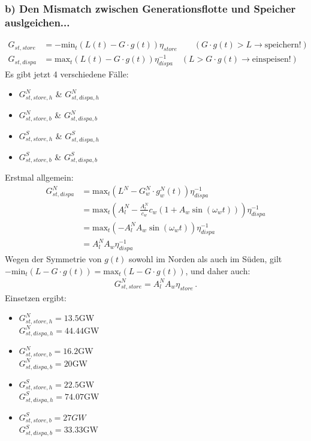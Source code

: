 \documentclass[11pt,a4paper,fleqn]{scrartcl}
\begin{document}
\begin{enumerate}[(a)]
 \subsubsection*{b) Den Mismatch zwischen Generationsflotte und Speicher auslgeichen...}
 \begin{align*}
       G_{st,store} &= - \mathrm{min}_t \left( L(t)-G\cdot g(t) \right) \eta_{store} \qquad \left(G\cdot g(t) > L \rightarrow \mathrm{speichern!}\right)\\
       G_{st,dispa} &= \mathrm{max}_t \left( L(t) - G\cdot g(t) \right) \eta_{dispa}^{-1} \quad (L > G\cdot g(t) \rightarrow \mathrm{einspeisen!})
 \end{align*}
 Es gibt jetzt 4 verschiedene Fälle:
 \begin{itemize}
       \item $G_{st,store,h}^N$ \& $G_{st,dispa,h}^N$
       \item $G_{st,store,b}^N$ \& $G_{st,dispa,b}^N$
       \item $G_{st,store,h}^S$ \& $G_{st,dispa,h}^S$
       \item $G_{st,store,b}^S$ \& $G_{st,dispa,b}^S$
 \end{itemize}
 Erstmal allgemein:
 \begin{align*}
       G_{st,dispa}^N &= \mathrm{max}_t \left(L^N-G^N_w\cdot g_w^N(t)\right)\eta_{dispa}^{-1} \\
       &= \mathrm{max}_t \left( A_l^N - \frac{A_l^N}{c_w}c_w\left(1+A_w\sin\left(\omega_wt\right)\right) \right) \eta_{dispa}^{-1} \\
       &= \mathrm{max}_t \left(-A_l^N A_w\sin\left(\omega_wt\right)\right) \eta_{dispa}^{-1} \\
       &= A_l^N A_w \eta_{dispa}^{-1}
 \end{align*}
 Wegen der Symmetrie von $g(t)$ sowohl im Norden als auch im S\"uden, gilt $-\mathrm{min}_t\left(L-G\cdot g(t)\right) = \mathrm{max}_t \left(L-G\cdot g(t)\right)$, und daher auch:
 \begin{align*}
       G_{st,store}^N = A_l^NA_w\eta_{store}\,.
 \end{align*}
 Einsetzen ergibt:
 \begin{itemize}
       \item $G_{st,store,h}^N = 13.5$GW \\ $G_{st,dispa,h}^N = 44.44$GW
       \item $G_{st,store,b}^N = 16.2$GW \\ $G_{st,dispa,b}^N = 20$GW
       \item $G_{st,store,h}^S=22.5$GW \\ $G_{st,dispa,h}^S = 74.07$GW
       \item $G_{st,store,b}^S = 27GW$ \\ $G_{st,dispa,b}^S = 33.33$GW
 \end{itemize}
 

\end{enumerate}
\end{document}
